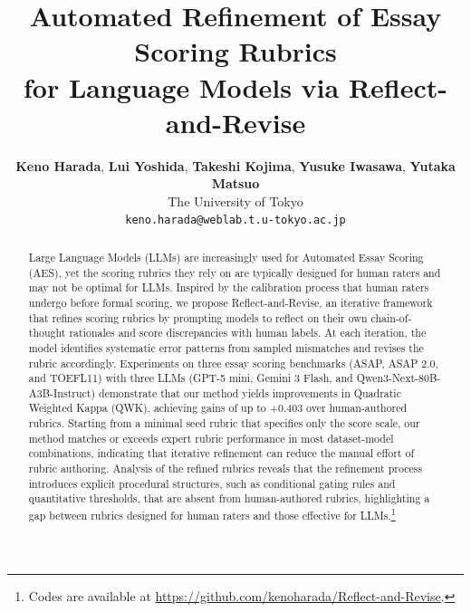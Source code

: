 \documentclass[11pt]{article}
\title{Automated Refinement of Essay Scoring Rubrics \\for Language Models via Reflect-and-Revise}
\author{
 \textbf{Keno Harada},
 \textbf{Lui Yoshida},
 \textbf{Takeshi Kojima},
 \textbf{Yusuke Iwasawa},
 \textbf{Yutaka Matsuo}
\\
The University of Tokyo
\\
 \small{
 \texttt{{keno.harada@weblab.t.u-tokyo.ac.jp}}}
 }
\begin{document}
\maketitle
\begin{abstract}
Large Language Models (LLMs) are increasingly used for Automated Essay Scoring (AES), yet the scoring rubrics they rely on are typically designed for human raters and may not be optimal for LLMs. Inspired by the calibration process that human raters undergo before formal scoring, we propose Reflect-and-Revise, an iterative framework that refines scoring rubrics by prompting models to reflect on their own chain-of-thought rationales and score discrepancies with human labels. At each iteration, the model identifies systematic error patterns from sampled mismatches and revises the rubric accordingly. Experiments on three essay scoring benchmarks (ASAP, ASAP 2.0, and TOEFL11) with three LLMs (GPT-5 mini, Gemini 3 Flash, and Qwen3-Next-80B-A3B-Instruct) demonstrate that our method yields improvements in Quadratic Weighted Kappa (QWK), achieving gains of up to +0.403 over human-authored rubrics. Starting from a minimal seed rubric that specifies only the score scale, our method matches or exceeds expert rubric performance in most dataset-model combinations, indicating that iterative refinement can reduce the manual effort of rubric authoring. Analysis of the refined rubrics reveals that the refinement process introduces explicit procedural structures, such as conditional gating rules and quantitative thresholds, that are absent from human-authored rubrics, highlighting a gap between rubrics designed for human raters and those effective for LLMs.\footnote{Codes are available at \url{https://github.com/kenoharada/Reflect-and-Revise}.}
\end{abstract}
\end{document}
